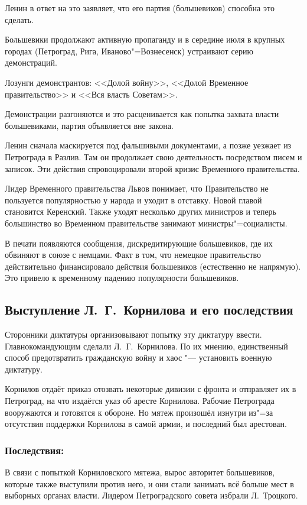 Ленин в ответ на это заявляет, что его партия (большевиков) способна это сделать.

Большевики продолжают активную пропаганду и в середине июля в крупных городах (Петроград, Рига, Иваново"=Вознесенск) устраивают серию демонстраций.

Лозунги демонстрантов: <<Долой войну>>, <<Долой Временное правительство>> и <<Вся власть Советам>>.

Демонстрации разгоняются и это расценивается как попытка захвата власти большевиками, партия объявляется вне закона.

Ленин сначала маскируется под фальшивыми документами, а позже уезжает из Петрограда в Разлив. Там он продолжает свою деятельность посредством писем и записок. Эти действия спровоцировали второй кризис Временного правительства.

Лидер Временного правительства Львов понимает, что Правительство не пользуется популярностью у народа и уходит в отставку. Новой главой становится Керенский. Также уходят несколько других министров и теперь большинство во Временном правительстве занимают министры"=социалисты.

В печати появляются сообщения, дискредитирующие большевиков, где их обвиняют в союзе с немцами. Факт в том, что немецкое правительство действительно финансировало действия большевиков (естественно не напрямую). Это привело к временному падению популярности большевиков.

\subsection{Выступление Л.~Г.~Корнилова и его последствия}

Сторонники диктатуры организовывают попытку эту диктатуру ввести. Главнокомандующим сделали Л.~Г.~Корнилова. По их мнению, единственный способ предотвратить гражданскую войну и хаос "--- установить военную диктатуру.

Корнилов отдаёт приказ отозвать некоторые дивизии с фронта и отправляет их в Петроград, на что издаётся указ об аресте Корнилова. Рабочие Петрограда вооружаются и готовятся к обороне. Но мятеж произошёл изнутри из"=за отсутствия поддержки Корнилова в самой армии, и последний был арестован.

\subsubsection{\textbf{Последствия:}}

В связи с попыткой Корниловского мятежа, вырос авторитет большевиков, которые также выступили против него, и они стали занимать всё больше мест в выборных органах власти. Лидером Петроградского совета избрали Л.~Троцкого.


